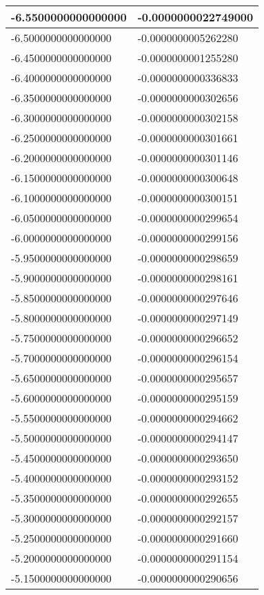 \documentclass[a4paper,14pt]{article}
\begin{document}
\begin{longtable}{|l|l|}
-6.5500000000000000	&	-0.0000000022749000\\ \hline
-6.5000000000000000	&	-0.0000000005262280\\ \hline
-6.4500000000000000	&	-0.0000000001255280\\ \hline
-6.4000000000000000	&	-0.0000000000336833\\ \hline
-6.3500000000000000	&	-0.0000000000302656\\ \hline
-6.3000000000000000	&	-0.0000000000302158\\ \hline
-6.2500000000000000	&	-0.0000000000301661\\ \hline
-6.2000000000000000	&	-0.0000000000301146\\ \hline
-6.1500000000000000	&	-0.0000000000300648\\ \hline
-6.1000000000000000	&	-0.0000000000300151\\ \hline
-6.0500000000000000	&	-0.0000000000299654\\ \hline
-6.0000000000000000	&	-0.0000000000299156\\ \hline
-5.9500000000000000	&	-0.0000000000298659\\ \hline
-5.9000000000000000	&	-0.0000000000298161\\ \hline
-5.8500000000000000	&	-0.0000000000297646\\ \hline
-5.8000000000000000	&	-0.0000000000297149\\ \hline
-5.7500000000000000	&	-0.0000000000296652\\ \hline
-5.7000000000000000	&	-0.0000000000296154\\ \hline
-5.6500000000000000	&	-0.0000000000295657\\ \hline
-5.6000000000000000	&	-0.0000000000295159\\ \hline
-5.5500000000000000	&	-0.0000000000294662\\ \hline
-5.5000000000000000	&	-0.0000000000294147\\ \hline
-5.4500000000000000	&	-0.0000000000293650\\ \hline
-5.4000000000000000	&	-0.0000000000293152\\ \hline
-5.3500000000000000	&	-0.0000000000292655\\ \hline
-5.3000000000000000	&	-0.0000000000292157\\ \hline
-5.2500000000000000	&	-0.0000000000291660\\ \hline
-5.2000000000000000	&	-0.0000000000291154\\ \hline
-5.1500000000000000	&	-0.0000000000290656\\ \hline

\end{longtable}
\end{document}
